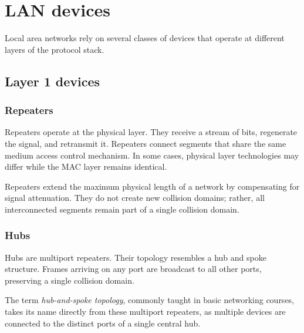 \section{LAN devices}

Local area networks rely on several classes of devices that operate at different layers of the protocol stack.

\subsection{Layer 1 devices}

\subsubsection*{Repeaters}

Repeaters operate at the physical layer. They receive a stream of bits, regenerate the signal, and retransmit it. Repeaters connect segments that share the same medium access control mechanism. In some cases, physical layer technologies may differ while the MAC layer remains identical.

Repeaters extend the maximum physical length of a network by compensating for signal attenuation. They do not create new collision domains; rather, all interconnected segments remain part of a single collision domain.

\begin{center}
\end{center}

\subsubsection*{Hubs}

Hubs are multiport repeaters. Their topology resembles a hub and spoke structure. Frames arriving on any port are broadcast to all other ports, preserving a single collision domain.

\begin{center}
\end{center}


The term \textit{hub-and-spoke topology}, commonly taught in basic networking courses, takes its name directly from these multiport repeaters, as multiple devices are connected to the distinct ports of a single central hub.  

